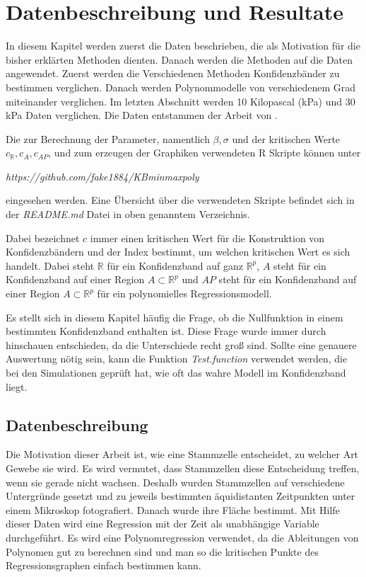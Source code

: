 \documentclass[12pt,a4paper]{article}
\theoremstyle{definition}
\theoremstyle{definition}
\theoremstyle{definition}
\theoremstyle{definition}
\begin{document}
\newpage
\section{Datenbeschreibung und Resultate}
In diesem Kapitel werden zuerst die Daten beschrieben, die als Motivation für die bisher erklärten Methoden dienten. Danach werden die Methoden auf die Daten angewendet. Zuerst werden die Verschiedenen Methoden Konfidenzbänder zu bestimmen verglichen. Danach werden Polynommodelle von verschiedenem Grad miteinander verglichen. Im letzten Abschnitt werden 10 Kilopascal (kPa) und 30 kPa Daten verglichen. Die Daten entstammen der Arbeit von \cite{Rehfeldt10}.

Die zur Berechnung der Parameter, namentlich $\beta, \sigma$ und der kritischen Werte $c_{\mathbb{R}}, c_{A}, c_{AP}$, und zum erzeugen der Graphiken verwendeten R Skripte können unter 

\begin{center}
\textit{https://github.com/fake1884/KBminmaxpoly} 
\end{center}

eingesehen werden. Eine Übersicht über die verwendeten Skripte befindet sich in der \textit{README.md} Datei in oben genanntem Verzeichnis.

Dabei bezeichnet $c$ immer einen kritischen Wert für die Konstruktion von Konfidenzbändern und der Index bestimmt, um welchen kritischen Wert es sich handelt. Dabei steht $\mathbb{R}$ für ein Konfidenzband auf ganz $\mathbb{R}^{p}$, $A$ steht für ein Konfidenzband auf einer Region $A \subset \mathbb{R}^{p}$ und $AP$ steht für ein Konfidenzband auf einer Region $A \subset \mathbb{R}^{p}$ für ein polynomielles Regressionsmodell.

Es stellt sich in diesem Kapitel häufig die Frage, ob die Nullfunktion in einem bestimmten Konfidenzband enthalten ist. Diese Frage wurde immer durch hinschauen entschieden, da die Unterschiede recht groß sind. Sollte eine genauere Auswertung nötig sein, kann die Funktion \textit{Test.function} verwendet werden, die bei den Simulationen geprüft hat, wie oft das wahre Modell im Konfidenzband liegt.

\subsection{Datenbeschreibung}
Die Motivation dieser Arbeit ist, wie eine Stammzelle entscheidet, zu welcher Art Gewebe sie wird. Es wird vermutet, dass Stammzellen diese Entscheidung treffen, wenn sie gerade nicht wachsen. Deshalb wurden Stammzellen auf verschiedene Untergründe gesetzt und zu jeweils bestimmten äquidistanten Zeitpunkten unter einem Mikroskop fotografiert. Danach wurde ihre Fläche bestimmt. Mit Hilfe dieser Daten wird eine Regression mit der Zeit als unabhängige Variable durchgeführt. Es wird eine Polynomregression verwendet, da die Ableitungen von Polynomen gut zu berechnen sind und man so die kritischen Punkte des Regressionsgraphen einfach bestimmen kann.
\end{document}
